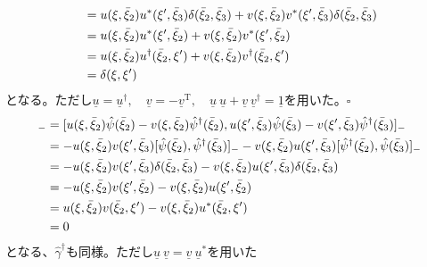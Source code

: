 \documentclass[dvipdfmx, 11pt, a4paper]{jsarticle}
\numberwithin{equation}{section}
\theoremstyle{definition}
\begin{document}
\begin{derivationBox}
\begin{align}
            &= u(\xi,\bar{\xi}_2)u^*(\xi',\bar{\xi}_3)\delta(\bar{\xi}_2,\bar{\xi}_3) + v(\xi,\bar{\xi}_2)v^*(\xi',\bar{\xi}_3) \delta(\bar{\xi}_2,\bar{\xi}_3) \notag \\
            &= u(\xi,\bar{\xi}_2)u^*(\xi',\bar{\xi}_2) + v(\xi,\bar{\xi}_2)v^*(\xi',\bar{\xi}_2)  \notag \\
            &= u(\xi,\bar{\xi}_2)u^\dagger(\bar{\xi}_2,\xi') + v(\xi,\bar{\xi}_2)v^\dagger(\bar{\xi}_2,\xi') \notag \\
            &= \delta(\xi,\xi')
        \end{align}
        となる。ただし$\underline{u} = \underline{u}^\dagger,\quad \underline{v} = -\underline{v}^\mathrm{T},\quad \underline{u}\ \underline{u} + \underline{v}\ \underline{v}^\dagger = \underline{1}$を用いた。$\square$\\
        \begin{align}
            [\hat{\gamma}(\xi),\hat{\gamma}(\xi')]_{-} &= [u(\xi,\bar{\xi}_2)\hat{\psi}(\bar{\xi}_2)-v(\xi,\bar{\xi}_2)\hat{\psi}^\dagger(\bar{\xi}_2), u(\xi',\bar{\xi}_3)\hat{\psi}(\bar{\xi}_3)-v(\xi',\bar{\xi}_3)\hat{\psi}^\dagger(\bar{\xi}_3)]_{-} \notag \\
            &= -u(\xi,\bar{\xi}_2)v(\xi',\bar{\xi}_3) [\hat{\psi}(\bar{\xi}_2),\hat{\psi}^\dagger(\bar{\xi}_3)]_{-}-v(\xi,\bar{\xi}_2)u(\xi',\bar{\xi}_3)[\hat{\psi}^\dagger(\bar{\xi}_2),\hat{\psi}(\bar{\xi}_3)]_{-} \notag \\
            &= -u(\xi,\bar{\xi}_2)v(\xi',\bar{\xi}_3) \delta(\bar{\xi}_2,\bar{\xi}_3)-v(\xi,\bar{\xi}_2)u(\xi',\bar{\xi}_3)\delta(\bar{\xi}_2,\bar{\xi}_3) \notag \\
            &= -u(\xi,\bar{\xi}_2)v(\xi',\bar{\xi}_2) -v(\xi,\bar{\xi}_2)u(\xi',\bar{\xi}_2)\notag \\
            &= u(\xi,\bar{\xi}_2)v(\bar{\xi}_2,\xi')-v(\xi,\bar{\xi}_2)u^*(\bar{\xi}_2,\xi') \notag \\
            &= 0
        \end{align}
        となる、$\hat{\gamma}^\dagger$も同様。ただし$\underline{u}\ \underline{v} = \underline{v}\ \underline{u}^*$を用いた
    \end{derivationBox}
\end{document}
